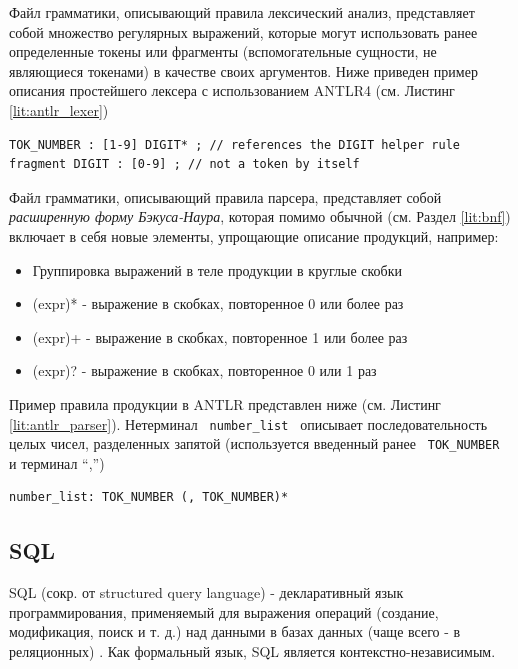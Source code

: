 Файл грамматики, описывающий правила лексический анализ, представляет собой множество регулярных выражений, которые могут использовать ранее определенные токены или фрагменты (вспомогательные сущности, не являющиеся токенами) в качестве своих аргументов. Ниже приведен пример описания простейшего лексера с использованием ANTLR4 (см. Листинг \ref{lit:antlr_lexer})

\begin{code}
\label{lit:antlr_lexer}
\begin{verbatim}
TOK_NUMBER : [1-9] DIGIT* ; // references the DIGIT helper rule
fragment DIGIT : [0-9] ; // not a token by itself
\end{verbatim}
\end{code}

Файл грамматики, описывающий правила парсера, представляет собой \textit{расширенную форму Бэкуса-Наура}, которая помимо обычной (см. Раздел \ref{lit:bnf}) включает в себя новые элементы, упрощающие описание продукций, например:

\begin{itemize}
    \item Группировка выражений в теле продукции в круглые скобки
    \item (expr)* - выражение в скобках, повторенное 0 или более раз
    \item (expr)+ - выражение в скобках, повторенное 1 или более раз
    \item (expr)? - выражение в скобках, повторенное 0 или 1 раз
\end{itemize}

Пример правила продукции в ANTLR представлен ниже (см. Листинг \ref{lit:antlr_parser}). Нетерминал \texttt{ number_list } описывает последовательность целых чисел, разделенных запятой (используется введенный ранее \texttt{ TOK_NUMBER } и терминал \enquote{,})

\begin{code}
\label{lit:antlr_parser}
\begin{verbatim}
number_list: TOK_NUMBER (, TOK_NUMBER)*
\end{verbatim}
\end{code}

\subsection{SQL} \label{lit:sql}
SQL (сокр. от structured query language) - декларативный язык программирования, применяемый для выражения операций (создание, модификация, поиск и т. д.) над данными в базах данных (чаще всего - в реляционных) \cite{sql_standard}. Как формальный язык, SQL является контекстно-независимым.

